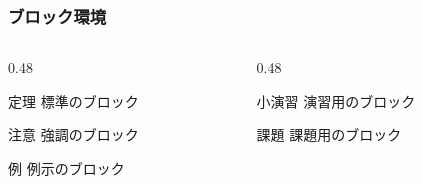 \documentclass[aspectratio=169, 10pt, fleqn, hyperref={pdfpagelabels=false, bookmarks=false, hyperfootnotes=false}]{beamer}
\begin{document}
\begin{frame}[label=blocks]
  \frametitle{ブロック環境}
  \begin{columns}[t]
    \begin{column}{0.48\textwidth}
      \begin{block}{定理}
        標準のブロック
      \end{block}
      \begin{alertblock}{注意}
        強調のブロック
      \end{alertblock}
      \begin{exampleblock}{例}
        例示のブロック
      \end{exampleblock}
    \end{column}
    \begin{column}{0.48\textwidth}
      \begin{exercise}{小演習}
        演習用のブロック
      \end{exercise}
      \begin{assignment}{課題}
        課題用のブロック
      \end{assignment}
    \end{column}
  \end{columns}
\end{frame}
\end{document}
